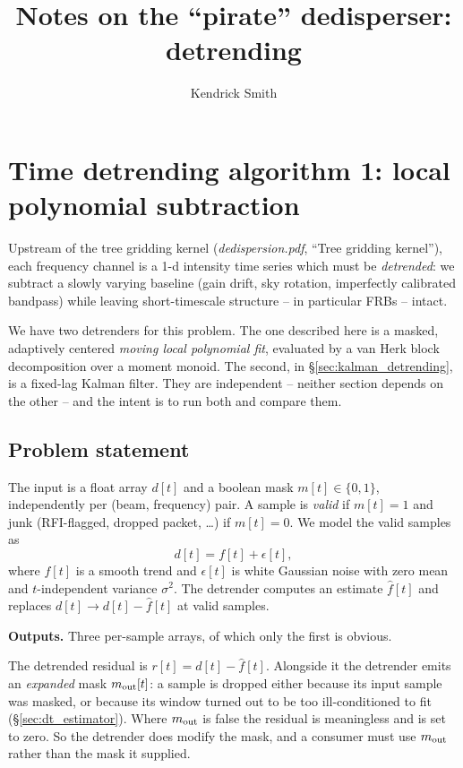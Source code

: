 \documentclass{article}
\title{Notes on the ``pirate'' dedisperser: detrending}
\author{Kendrick Smith}
\numberwithin{equation}{section}   %
\newcommand{\ddnotes}[1]{{\em dedispersion.pdf}, ``#1''}
\begin{document}
\maketitle

\tableofcontents

\setlength{\parskip}{2.5pt}  %

\clearpage

\section{Time detrending algorithm 1: local polynomial subtraction}
\label{sec:time_detrending}

Upstream of the tree gridding kernel (\ddnotes{Tree gridding kernel}), each frequency channel is a 1-d intensity time
series which must be {\em detrended}: we subtract a slowly varying baseline (gain drift, sky rotation,
imperfectly calibrated bandpass) while leaving short-timescale structure -- in particular FRBs -- intact.

We have two detrenders for this problem.  The one described here is a masked, adaptively centered {\em moving
local polynomial fit}, evaluated by a van Herk block decomposition over a moment monoid.  The second, in
\S\ref{sec:kalman_detrending}, is a fixed-lag Kalman filter.  They are independent -- neither section depends
on the other -- and the intent is to run both and compare them.

\subsection{Problem statement}
\label{sec:dt_problem}

The input is a float array $d[t]$ and a boolean mask $m[t] \in \{0,1\}$, independently per (beam, frequency)
pair.  A sample is {\em valid} if $m[t]=1$ and junk (RFI-flagged, dropped packet, \ldots) if $m[t]=0$.
We model the valid samples as
\begin{equation}
d[t] = f[t] + \epsilon[t],
\end{equation}
where $f[t]$ is a smooth trend and $\epsilon[t]$ is white Gaussian noise with zero mean and $t$-independent
variance $\sigma^2$.  The detrender computes an estimate $\hat f[t]$ and replaces $d[t] \rightarrow d[t] - \hat f[t]$
at valid samples.

{\bf Outputs.}  Three per-sample arrays, of which only the first is obvious.

The detrended residual is $r[t] = d[t] - \hat f[t]$.  Alongside it the detrender emits an {\em expanded} mask
$m_{\rm out}[t]$: a sample is dropped either because its input sample was masked, or because its window turned
out to be too ill-conditioned to fit (\S\ref{sec:dt_estimator}).  Where $m_{\rm out}$ is false the residual is
meaningless and is set to zero.  So the detrender does modify the mask, and a consumer must use
$m_{\rm out}$ rather than the mask it supplied.
\end{document}
